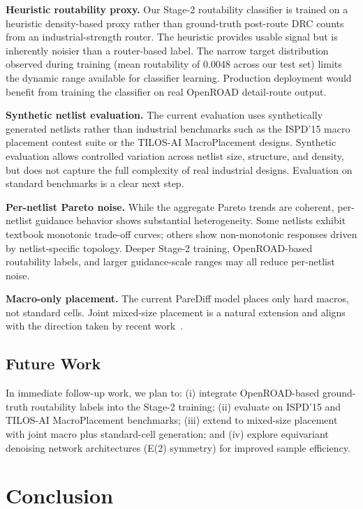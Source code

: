 \documentclass{ieeeaccess}
\begin{document}
\textbf{Heuristic routability proxy.} Our Stage-2 routability classifier is trained on a heuristic density-based proxy rather than ground-truth post-route DRC counts from an industrial-strength router. The heuristic provides usable signal but is inherently noisier than a router-based label. The narrow target distribution observed during training (mean routability of 0.0048 across our test set) limits the dynamic range available for classifier learning. Production deployment would benefit from training the classifier on real OpenROAD detail-route output.

\textbf{Synthetic netlist evaluation.} The current evaluation uses synthetically generated netlists rather than industrial benchmarks such as the ISPD'15 macro placement contest suite or the TILOS-AI MacroPlacement designs. Synthetic evaluation allows controlled variation across netlist size, structure, and density, but does not capture the full complexity of real industrial designs. Evaluation on standard benchmarks is a clear next step.

\textbf{Per-netlist Pareto noise.} While the aggregate Pareto trends are coherent, per-netlist guidance behavior shows substantial heterogeneity. Some netlists exhibit textbook monotonic trade-off curves; others show non-monotonic responses driven by netlist-specific topology. Deeper Stage-2 training, OpenROAD-based routability labels, and larger guidance-scale ranges may all reduce per-netlist noise.

\textbf{Macro-only placement.} The current PareDiff model places only hard macros, not standard cells. Joint mixed-size placement is a natural extension and aligns with the direction taken by recent work~\cite{trung2025diffplace}.

\subsection{Future Work}

In immediate follow-up work, we plan to: (i) integrate OpenROAD-based ground-truth routability labels into the Stage-2 training; (ii) evaluate on ISPD'15 and TILOS-AI MacroPlacement benchmarks; (iii) extend to mixed-size placement with joint macro plus standard-cell generation; and (iv) explore equivariant denoising network architectures (E(2) symmetry) for improved sample efficiency.

\section{Conclusion}
\label{sec:conclusion}
\end{document}

